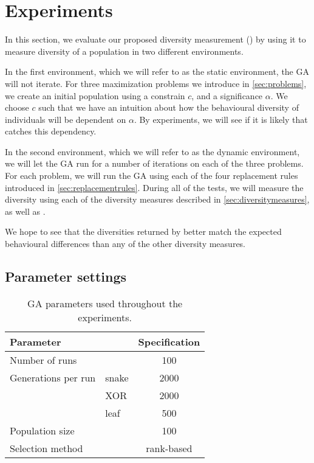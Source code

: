 \section{Experiments}\label{sec:experiments}
In this section, we evaluate our proposed diversity measurement (\dia) by using it to measure diversity of a population in two different environments.

In the first environment, which we will refer to as the static environment, the GA will not iterate.
For three maximization problems we introduce in \cref{sec:problems}, we create an initial population using a constrain $c$, and a significance $\alpha$. We choose $c$ such that we have an intuition about how the behavioural diversity of individuals will be dependent on $\alpha$. By experiments, we will see if it is likely that \dia{} catches this dependency.

In the second environment, which we will refer to as the dynamic environment, we will let the GA run for a number of iterations on each of the three problems. 
For each problem, we will run the GA using each of the four replacement rules introduced in \cref{sec:replacementrules}.
During all of the tests, we will measure the diversity using each of the diversity measures described in \cref{sec:diversitymeasures}, as well as \dia.

We hope to see that the diversities returned by \dia{} better match the expected behavioural differences than any of the other diversity measures.

\subsection{Parameter settings}

\begin{table}
  \centering
  \begin{tabular}{l l S}
    \toprule
    Parameter & & {Specification} \\
    \midrule
    Number of runs & & 100 \\
    Generations per run & snake & 2000 \\
    & XOR & 2000 \\
    & leaf & 500 \\
    Population size & & 100 \\
    Selection method & & {rank-based} \\
    \bottomrule
  \end{tabular}
  \caption{GA parameters used throughout the experiments.}
  \label{tab:gaparam}
\end{table}

